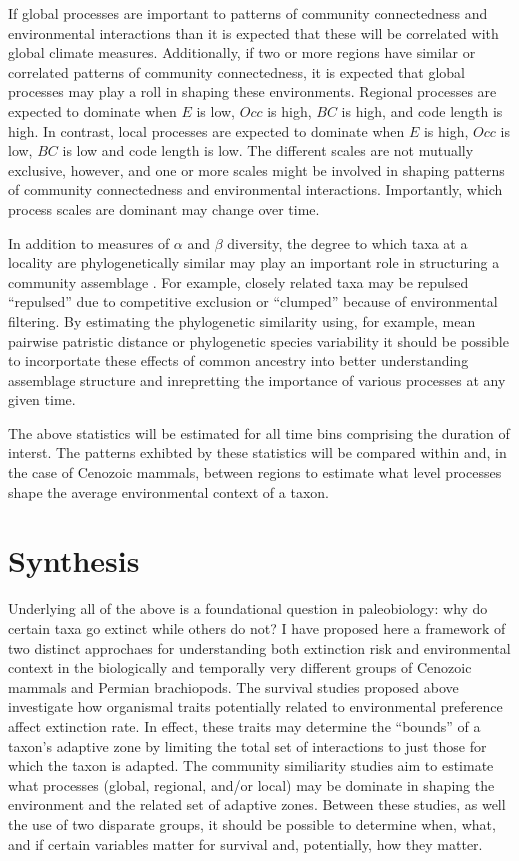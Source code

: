 \documentclass[12pt,letterpaper]{article}
\begin{document}
If global processes are important to patterns of community connectedness and environmental interactions than it is expected that these will be correlated with global climate measures. Additionally, if two or more regions have similar or correlated patterns of community connectedness, it is expected that global processes may play a roll in shaping these environments. Regional processes are expected to dominate when \(E\) is low, \(Occ\) is high, \(BC\) is high, and code length is high. In contrast, local processes are expected to dominate when \(E\) is high, \(Occ\) is low, \(BC\) is low and code length is low. The different scales are not mutually exclusive, however, and one or more scales might be involved in shaping patterns of community connectedness and environmental interactions. Importantly, which process scales are dominant may change over time.

In addition to measures of \(\alpha\) and \(\beta\) diversity, the degree to which taxa at a locality are phylogenetically similar may play an important role in structuring a community assemblage \citep{Webb2002}. For example, closely related taxa may be repulsed ``repulsed'' due to competitive exclusion or ``clumped'' because of environmental filtering. By estimating the phylogenetic similarity using, for example, mean pairwise patristic distance \citep{Webb2002} or phylogenetic species variability \citep{Helmus2007a} it should be possible to incorportate these effects of common ancestry into better understanding assemblage structure and inrepretting the importance of various processes at any given time.

The above statistics will be estimated for all time bins comprising the duration of interst. The patterns exhibted by these statistics will be compared within and, in the case of Cenozoic mammals, between regions to estimate what level processes shape the average environmental context of a taxon.


\section{Synthesis}
Underlying all of the above is a foundational question in paleobiology: why do certain taxa go extinct while others do not? I have proposed here a framework of two distinct approchaes for understanding both extinction risk and environmental context in the biologically and temporally very different groups of Cenozoic mammals and Permian brachiopods. The survival studies proposed above investigate how organismal traits potentially related to environmental preference affect extinction rate. In effect, these traits may determine the ``bounds'' of a taxon's adaptive zone by limiting the total set of interactions to just those for which the taxon is adapted. The community similiarity studies aim to estimate what processes (global, regional, and/or local) may be dominate in shaping the environment and the related set of adaptive zones. Between these studies, as well the use of two disparate groups, it should be possible to determine when, what, and if certain variables matter for survival and, potentially, how they matter. 

\clearpage


\end{document}
